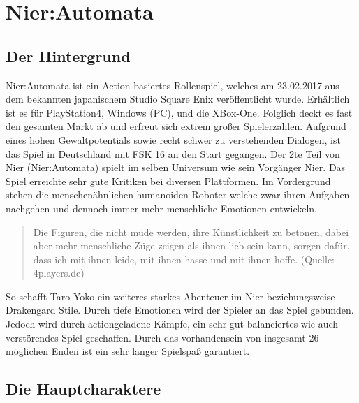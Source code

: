 %
%
%
%

\chapter{Nier:Automata}
\section{Der Hintergrund}
Nier:Automata ist ein Action basiertes Rollenspiel, welches am 23.02.2017 aus dem bekannten japanischem Studio Square Enix veröffentlicht wurde. Erhältlich ist es für PlayStation4, Windows (PC), und die XBox-One. Folglich deckt es fast den gesamten Markt ab und erfreut sich extrem großer Spielerzahlen. Aufgrund eines hohen Gewaltpotentials sowie recht schwer zu verstehenden Dialogen, ist das Spiel in Deutschland mit FSK 16 an den Start gegangen. Der 2te Teil von Nier (Nier:Automata) spielt im selben Universum wie sein Vorgänger Nier. Das Spiel erreichte sehr gute Kritiken bei diversen Plattformen. Im Vordergrund stehen die menschenähnlichen humanoiden Roboter welche zwar ihren Aufgaben nachgehen und dennoch immer mehr menschliche Emotionen entwickeln.

  \begin{quote}
	Die Figuren, die nicht müde werden, ihre Künstlichkeit zu betonen, dabei aber mehr menschliche Züge zeigen als ihnen lieb sein kann, sorgen dafür, dass ich mit ihnen leide, mit ihnen hasse und mit ihnen hoffe. (Quelle: 4players.de)
	\end{quote}

So schafft Taro Yoko ein weiteres starkes Abenteuer im Nier beziehungsweise Drakengard Stile. Durch tiefe Emotionen wird der Spieler an das Spiel gebunden. Jedoch wird durch actiongeladene Kämpfe, ein sehr gut balanciertes wie auch verstörendes Spiel geschaffen. 
Durch das vorhandensein von insgesamt 26 möglichen Enden ist ein sehr langer Spielspaß garantiert.

\section{Die Hauptcharaktere}

